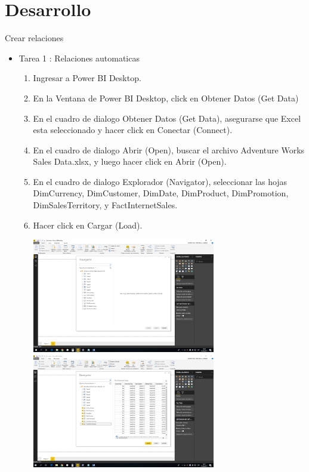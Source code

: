 \section{Desarrollo } 

Crear relaciones
\begin{itemize}

\item Tarea 1 :  Relaciones automaticas


\begin{enumerate}
\item Ingresar a Power BI Desktop.
\item En la Ventana de Power BI Desktop, click en Obtener Datos (Get Data)
\item En el cuadro de dialogo Obtener Datos (Get Data), asegurarse que Excel esta seleccionado y hacer click
en Conectar (Connect).
\item En el cuadro de dialogo Abrir (Open), buscar el archivo Adventure Works Sales Data.xlsx, y luego hacer
click en Abrir (Open).
\item En el cuadro de dialogo Explorador (Navigator), seleccionar las hojas DimCurrency, DimCustomer,
DimDate, DimProduct, DimPromotion, DimSalesTerritory, y FactInternetSales.
\item Hacer click en Cargar (Load).

\includegraphics[width=8cm]{./Imagenes/1.png} \includegraphics[width=8cm]{./Imagenes/2.png}


\end{enumerate}
\end{itemize}
